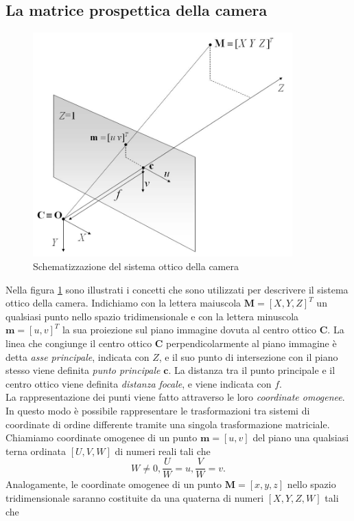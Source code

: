 \subsection{La matrice prospettica della camera}
\begin{figure}
	\centering
	\includegraphics[width=10cm]{./pictures/modelloCamera}
	\caption{Schematizzazione del sistema ottico della camera}
	\label{fig:modelloCamera}
\end{figure} 
Nella figura \ref{fig:modelloCamera} sono illustrati i concetti che sono utilizzati per descrivere il sistema ottico della camera.
Indichiamo con la lettera maiuscola $\textbf{M}=[X, Y, Z]^\textit{T}$ un qualsiasi punto nello spazio tridimensionale e con la lettera minuscola $\textbf{m} = [u, v]^\textit{T}$ la sua proiezione sul piano immagine dovuta al centro ottico $\textbf{C}$.
La linea che congiunge il centro ottico $\textbf{C}$ perpendicolarmente al piano immagine \`e detta \textit{asse principale}, indicata con $Z$, e il suo punto di intersezione con il piano stesso viene definita \textit{punto principale} $\textbf{c}$.
La distanza tra il punto principale e il centro ottico viene definita \textit{distanza focale},  e viene indicata con $f$.\\
La rappresentazione dei punti viene fatto attraverso le loro \textit{coordinate omogenee}.
In questo modo \`e possibile rappresentare le trasformazioni tra sistemi di coordinate di ordine differente tramite una singola trasformazione matriciale.
Chiamiamo coordinate omogenee di un punto $\textbf{m} = [u,v]$ del piano una qualsiasi terna ordinata $[U,V,W]$ di numeri reali tali che
\[W\neq 0,
\frac{U}{W}=u,
\frac{V}{W}=v.\]
Analogamente, le coordinate omogenee di un punto $\textbf{M}=[x,y,z]$ nello spazio tridimensionale saranno costituite da una quaterna di numeri $[X,Y,Z,W]$ tali che 
